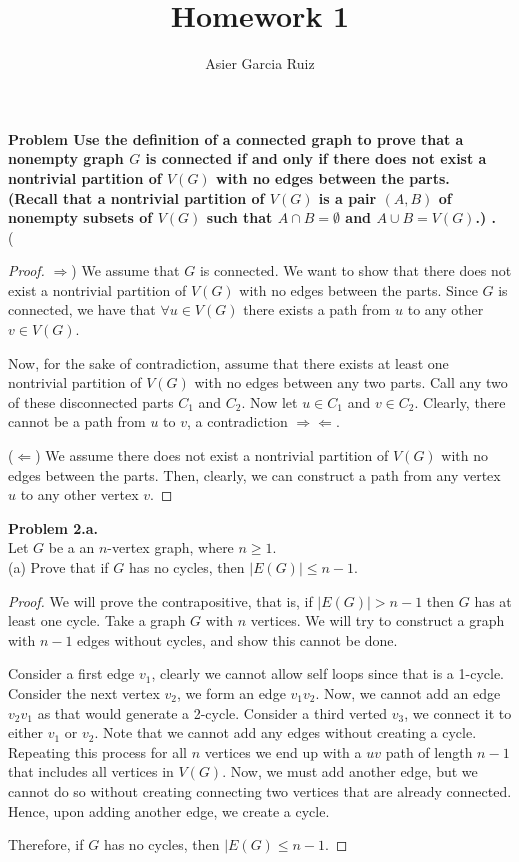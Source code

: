 \documentclass{article}
\title{Homework 1}
\author{Asier Garcia Ruiz}
\newcommand{\contradiction}{\Rightarrow\!\Leftarrow}
\newenvironment{hwproof}[2]
{
    \textbf{Problem #1.}\\
    #2
    \begin{proof}
}{
    \end{proof}
}
\begin{document}
\maketitle

\begin{hwproof}{1}{
        Use the definition of a connected graph to prove that a nonempty graph $G$
        is connected if and only if there does not exist a nontrivial partition of $V(G)$
        with no edges between the parts.\\
        (Recall that a nontrivial partition of $V(G)$ is a pair $(A, B)$ of nonempty subsets
        of $V(G)$ such that $A \cap B = \emptyset$ and $A \cup B = V(G)$.)
    }
    ($\Rightarrow$) We assume that $G$ is connected. We want to show that there does not exist
    a nontrivial partition of $V(G)$ with no edges between the parts. Since $G$ is connected,
    we have that $\forall u \in V(G)$ there exists a path from $u$ to any other $v \in V(G)$.

    Now, for the sake of contradiction, assume that there exists at least one nontrivial partition of
    $V(G)$ with no edges between any two parts. Call any two of these disconnected parts $C_1$
    and $C_2$. Now let $u \in C_1$ and $v \in C_2$. Clearly, there cannot be a path from
    $u$ to $v$, a contradiction $\contradiction$.

    ($\Leftarrow$) We assume there does not exist a nontrivial partition of $V(G)$ with no edges
    between the parts. Then, clearly, we can construct a path from any vertex $u$ to any other
    vertex $v$.
\end{hwproof}

\begin{hwproof}{2.a}{
        Let $G$ be a an $n$-vertex graph, where $n \geq 1$.\\
        (a) Prove that if $G$ has no cycles, then $|E(G)| \leq n - 1$.
    }
    We will prove the contrapositive, that is, if $|E(G)| > n - 1$ then $G$ has at least one
    cycle. Take a graph $G$ with $n$ vertices. We will try to construct a graph with $n-1$
    edges without cycles, and show this cannot be done.

    Consider a first edge $v_1$, clearly we cannot allow self loops since that is a 1-cycle.
    Consider the next vertex $v_2$, we form an edge $v_1v_2$. Now, we cannot add an edge $v_2v_1$
    as that would generate a 2-cycle. Consider a third verted $v_3$, we connect it to either
    $v_1$ or $v_2$. Note that we cannot add any edges without creating a cycle. Repeating this
    process for all $n$ vertices we end up with a $uv$ path of length $n-1$ that includes
    all vertices in $V(G)$. Now, we must add another edge, but we cannot do so without
    creating connecting two vertices that are already connected. Hence, upon adding another
    edge, we create a cycle.

    Therefore, if $G$ has no cycles, then $|E(G) \leq n - 1$.
\end{hwproof}
\end{document}
